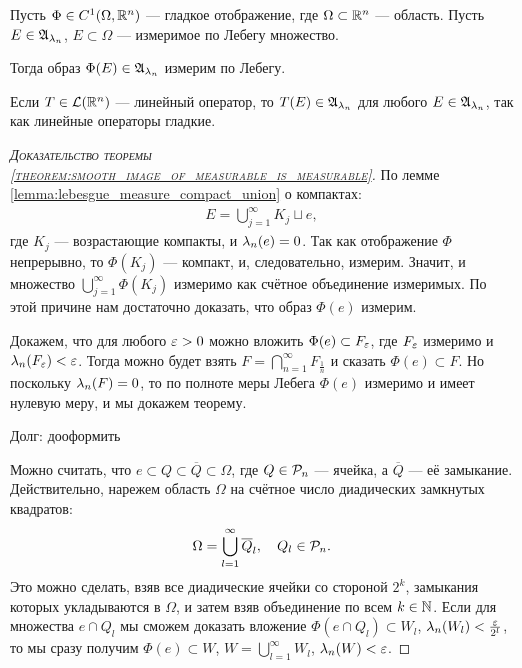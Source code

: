 \begin{thm}
 \label{theorem:smooth_image_of_measurable_is_measurable}
 Пусть $\Phi \in C^{1}(\Omega, \mathbb{R}^{n})$ --- гладкое отображение, где $\Omega \subset \mathbb{R}^{n}$ --- область. Пусть $E \in \mathfrak{A}_{\lambda_n}$, $E \subset \Omega$ --- измеримое по Лебегу множество.

 Тогда образ $\Phi(E) \in \mathfrak{A}_{\lambda_n}$ измерим по Лебегу.
\end{thm}
\begin{remrk*}
 Если $T \in \mathcal{L}(\mathbb{R}^{n})$ --- линейный оператор, то $T(E) \in \mathfrak{A}_{\lambda_n}$  для любого $E \in \mathfrak{A}_{\lambda_n}$, так как линейные операторы гладкие.
\end{remrk*}
\begin{proof}[\normalfont\textsc{Доказательство теоремы \ref{theorem:smooth_image_of_measurable_is_measurable}}]
 По лемме \ref{lemma:lebesgue_measure_compact_union} о компактах: \begin{align*}
  E = \bigcup_{j=1}^{\infty} K_j \sqcup e
 ,\end{align*} где $K_j$ --- возрастающие компакты, и $\lambda_n(e) = 0$. Так как отображение $\Phi$ непрерывно, то $\Phi(K_j)$ --- компакт, и, следовательно, измерим. Значит, и множество  $\bigcup_{j=1}^{\infty} \Phi(K_j)$ измеримо как счётное объединение измеримых. По этой причине нам достаточно доказать, что образ $\Phi(e)$ измерим.

 Докажем, что для любого $\varepsilon > 0$ можно вложить $\Phi(e) \subset F_{\varepsilon}$, где $F_{\varepsilon}$ измеримо и $\lambda_n(F_{\varepsilon}) < \varepsilon$. Тогда можно будет взять $F = \bigcap_{n=1}^{\infty} F_{\frac{1}{n}}$ и сказать $\Phi(e) \subset F$. Но поскольку $\lambda_n(F) = 0$, то по полноте меры Лебега $\Phi(e)$ измеримо и имеет нулевую меру, и мы докажем теорему.

 {\color{red} Долг: дооформить}

 Можно считать, что $e \subset Q \subset \overline Q \subset \Omega$, где $Q \in \mathcal{P}_n$ --- ячейка, а $\overline Q$ --- её замыкание. Действительно, нарежем область $\Omega$ на счётное число диадических замкнутых квадратов:
 \begin{align*}
  \Omega = \bigcup_{l=1}^{\infty} \overline Q_l, \quad Q_l \in \mathcal{P}_n.
 \end{align*} Это можно сделать, взяв все диадические ячейки со стороной $2^{k}$, замыкания которых укладываются в $\Omega$, и затем взяв объединение по всем $k \in \mathbb{N}$. Если для множества $e \cap Q_l$ мы сможем доказать вложение $\Phi(e \cap Q_l) \subset W_l$, $\lambda_n(W_l) < \frac{\varepsilon}{2^{l}}$, то мы сразу получим $\Phi(e) \subset W$, $W = \bigcup_{l=1}^{\infty} W_l $, $\lambda_n(W) < \varepsilon$.
  


\end{proof}

